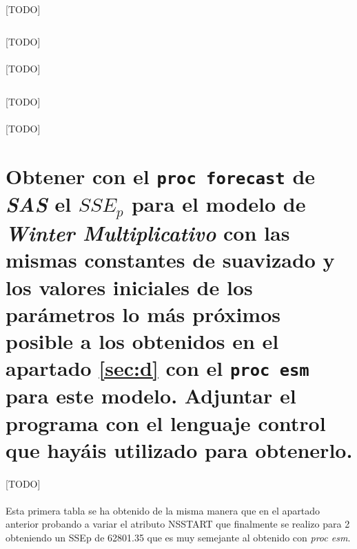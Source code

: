 \documentclass[a4paper, spanish]{article}
\begin{document}
    \paragraph{}
    [TODO]

    \begin{listing}[htb!]
      \centering
      \inputminted{SAS}{./res/code/d-02-prediction-error-esm-wintermul.sas}
      \caption{[TODO]}
      \label{code:d_prediction_error_esm_wintermul}
    \end{listing}

    \paragraph{}
    [TODO]

    \begin{listing}[htb!]
      \centering
      \inputminted{SAS}{./res/code/d-03-error-summary.sas}
      \caption{[TODO]}
      \label{code:d_summary_error}
    \end{listing}

    \paragraph{}
    [TODO]

  \section{Obtener con el \texttt{proc forecast} de \emph{SAS} el $SSE_p$ para el modelo de \emph{Winter Multiplicativo} con las mismas constantes de suavizado y los valores iniciales de los parámetros lo más próximos posible a los obtenidos en el apartado \ref{sec:d} con el \texttt{proc esm} para este modelo. Adjuntar el programa con el lenguaje control que hayáis utilizado para obtenerlo.}
  \label{sec:e}

    \paragraph{}
    [TODO]

    \paragraph{}
    Esta primera tabla se ha obtenido de la misma manera que en el apartado anterior probando a variar  el  atributo NSSTART que finalmente se realizo para 2 obteniendo un SSEp de 62801.35 que es muy semejante al obtenido con \textit{proc esm}.
\end{document}

